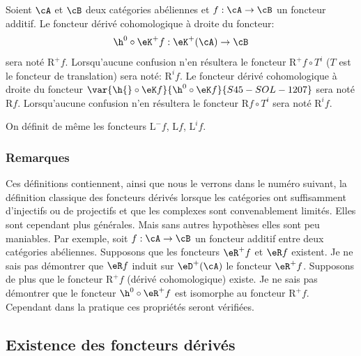 Soient $\cA$ et $\cB$ deux catégories abéliennes et $f:\cA\to \cB$ un 
foncteur additif. Le foncteur dérivé cohomologique à droite du foncteur: 
\[
  \h^0{}\circ \eK^+ f:\eK^+(\cA) \to \cB 
\]
sera noté $\mathrm{R}^+ f$. Lorsqu'aucune confusion n'en résultera le foncteur 
$\mathrm{R}^+ f\circ T^i$ ($T$ est le foncteur de translation) sera noté: 
$\mathrm{R}^i f$. Le foncteur dérivé cohomologique à droite du foncteur 
$\var{\h{}\circ \eK f}{\h^0{}\circ \eK f}{S45-SOL-1207}$ sera noté $\mathrm{R} f$. Lorsqu'aucune confusion n'en résultera 
le foncteur $\mathrm{R} f\circ T^i$ sera noté $\mathrm{R}^i f$. 

On définit de même les foncteurs $\mathrm{L}^- f$, $\mathrm{L} f$, $\mathrm{L}^i f$. 





\subsubsection{Remarques}\label{VIII:4-1-6}

Ces définitions contiennent, ainsi que nous le verrons dans le numéro 
suivant, la définition classique des foncteurs dérivés lorsque les 
catégories ont suffisamment d'injectifs ou de projectifs et que les complexes 
sont convenablement limités. Elles sont cependant plus générales. Mais 
sans autres hypothèses elles sont peu maniables. Par exemple, soit 
$f:\cA\to \cB$ un foncteur additif entre deux catégories abéliennes. 
Supposons que les foncteurs $\eR^+ f$ et $\eR f$ existent. Je ne sais pas 
démontrer que $\eR f$ induit sur $\eD^+(\cA)$ le foncteur $\eR^+ f$. Supposons 
de plus que le foncteur $\mathrm{R}^+ f$ (dérivé cohomologique) existe. Je ne sais 
pas démontrer que le foncteur $\h^0{}\circ \eR^+ f$ est isomorphe au foncteur 
$\mathrm{R}^+ f$. Cependant dans la pratique ces propriétés seront vérifiées. 










\subsection{Existence des foncteurs dérivés}\label{VIII:4-2}





